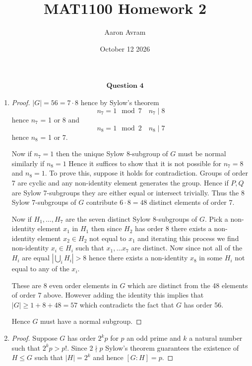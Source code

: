 \documentclass[12pt]{article}
\title{MAT1100 Homework 2}
\author{Aaron Avram}
\date{October 12 2026}
\begin{document}
\newtheorem{definition}{Definition}
\newtheorem{theorem}{Theorem}
\newtheorem{claim}{Claim}
\newtheorem{corollary}{Corollary}

\maketitle

\begin{align*}
    \textbf{Question 4}
\end{align*}

\begin{enumerate}
    \item[(a)]
    \begin{proof}
        $|G| = 56 = 7 \cdot 8$ hence by Sylow's theorem
        \[ n_7 = 1 \mod 7  \quad n_7 \mid 8 \]
        hence $n_7$ = 1 or 8
        and
        \[ n_8 = 1 \mod 2 \quad n_8 \mid 7 \]
        hence $n_8$ = 1 or 7.

        Now if $n_7 = 1$ then the unique Sylow 8-subgroup of $G$
        must be normal similarly if $n_8 = 1$ Hence it suffices to show that it is not possible
        for $n_7 = 8$ and $n_8 = 1$. To prove this, suppose it holds for contradiction.
        Groups of order 7 are cyclic and any non-identity element generates the group.
        Hence if $P, Q$ are Sylow 7-subgroups
        they are either equal or intersect trivially. Thus the 8 Sylow 7-subgroups
        of $G$ contribute $6 \cdot 8 = 48$ distinct elements of order 7.

        Now if $H_1, \ldots, H_7$ are the seven distinct Sylow 8-subgroups of $G$.
        Pick a non-identity element $x_1$ in $H_1$ then since $H_2$ has order 8 there exists
        a non-identity element $x_2 \in H_2$ not equal to $x_1$ and iterating this process
        we find non-identity $x_i \in H_i$ such that $x_1, \ldots x_7$ are distinct.
        Now since not all of the $H_i$ are equal $|\bigcup_{i}H_i| > 8$ hence there exists a non-identity $x_8$
        in some $H_i$ not equal to any of the $x_i$. 
        
        These are 8 even order elements in $G$ which are distinct from the 48 elements of order 7 above.
        However adding the identity this implies that $|G| \geq 1 + 8 + 48 = 57$ which contradicts the fact
        that $G$ has order 56.

        Hence $G$ must have a normal subgroup.
    \end{proof}

    \item[(b)]
    \begin{proof}
        Suppose $G$ has order $2^kp$ for $p$ an odd prime and $k$ a natural number such that
        $2^kp > p!$. Since $2 \nmid p$ Sylow's theorem guarantees the existence of $H \leq G$
        such that $|H| = 2^k$ and hence $[G: H] = p$.


\end{proof}
\end{enumerate}
\end{document}
